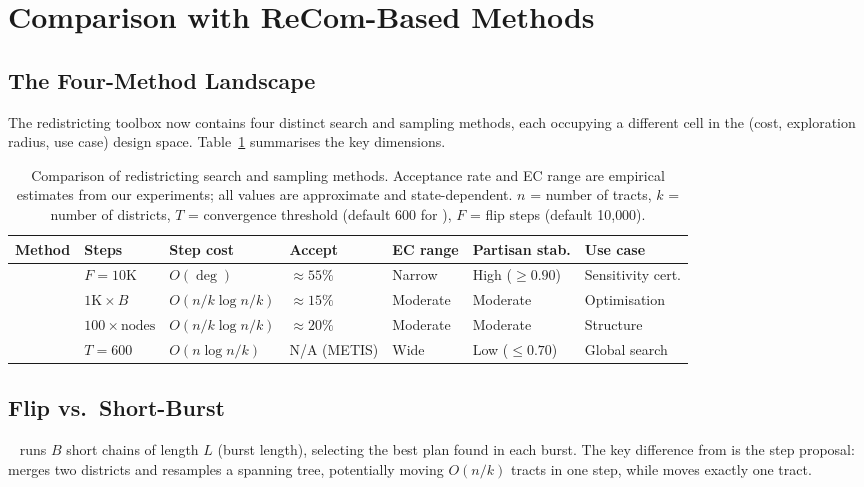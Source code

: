 \section{Comparison with ReCom-Based Methods}
\label{sec:comparison}

\subsection{The Four-Method Landscape}

The redistricting toolbox now contains four distinct search and sampling
methods, each occupying a different cell in the (cost, exploration radius,
use case) design space.
Table~\ref{tab:comparison} summarises the key dimensions.

\begin{table}[ht]
\centering
\caption{Comparison of redistricting search and sampling methods.
  Acceptance rate and EC range are empirical estimates from our experiments;
  all values are approximate and state-dependent.
  $n$ = number of tracts, $k$ = number of districts, $T$ = convergence
  threshold (default 600 for \cs{}), $F$ = flip steps (default 10{,}000).}
\label{tab:comparison}
\renewcommand{\arraystretch}{1.35}
\begin{tabular}{@{}lllllll@{}}
\toprule
Method & Steps & Step cost & Accept & EC range & Partisan stab. & Use case \\
\midrule
\flip{}
  & $F = 10\text{K}$
  & $O(\deg)$
  & $\approx\!55\%$
  & Narrow
  & High ($\geq\!0.90$)
  & Sensitivity cert. \\
\sburst{}~\citep{g6paper}
  & $1\text{K} \times B$
  & $O(n/k \log n/k)$
  & $\approx\!15\%$
  & Moderate
  & Moderate
  & Optimisation \\
\be{}~\citep{h1paper}
  & $100 \times \text{nodes}$
  & $O(n/k \log n/k)$
  & $\approx\!20\%$
  & Moderate
  & Moderate
  & Structure \\
\cs{}~\citep{b11paper}
  & $T = 600$
  & $O(n \log n / k)$
  & N/A (METIS)
  & Wide
  & Low ($\leq\!0.70$)
  & Global search \\
\bottomrule
\end{tabular}
\end{table}

\subsection{Flip vs.\ Short-Burst}

\sburst{}~\citep{cannon2022,g6paper} runs $B$ short \recom{} chains of length
$L$ (burst length), selecting the best plan found in each burst.
The key difference from \flip{} is the step proposal: \recom{} merges two
districts and resamples a spanning tree, potentially moving $O(n/k)$ tracts
in one step, while \flip{} moves exactly one tract.

